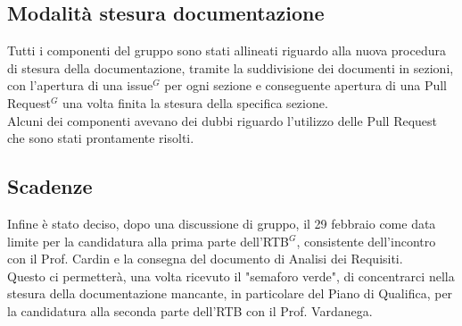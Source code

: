 \documentclass[a4paper, 11pt]{article}
\begin{document}
\subsection{Modalità stesura documentazione}
Tutti i componenti del gruppo sono stati allineati riguardo alla nuova procedura di stesura della documentazione, tramite la suddivisione dei documenti in sezioni, 
con l'apertura di una issue$^{G}$ per ogni sezione e conseguente apertura di una Pull Request$^{G}$ una volta finita la stesura della specifica sezione. \\
Alcuni dei componenti avevano dei dubbi riguardo l'utilizzo delle Pull Request che sono stati prontamente risolti.

\subsection{Scadenze}
Infine è stato deciso, dopo una discussione di gruppo, il 29 febbraio come data limite per la candidatura alla prima parte dell'RTB$^{G}$, consistente dell'incontro con il Prof. Cardin e la consegna del documento di Analisi dei Requisiti. \\
Questo ci permetterà, una volta ricevuto il "semaforo verde", di concentrarci nella stesura della documentazione mancante, in particolare del Piano di Qualifica, per la candidatura alla seconda parte dell'RTB con il Prof. Vardanega.
\end{document}
